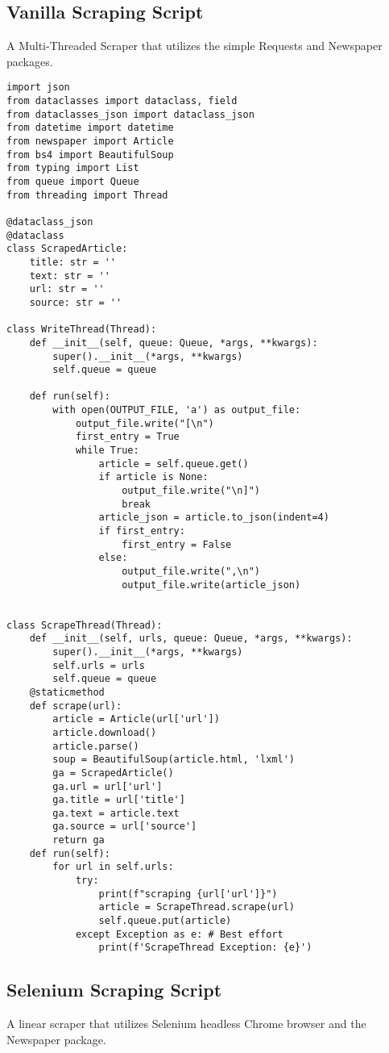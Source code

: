 \subsection{Vanilla Scraping Script}
A Multi-Threaded Scraper that utilizes the simple Requests and Newspaper packages.

\begin{verbatim}
import json
from dataclasses import dataclass, field
from dataclasses_json import dataclass_json
from datetime import datetime
from newspaper import Article
from bs4 import BeautifulSoup
from typing import List
from queue import Queue
from threading import Thread

@dataclass_json
@dataclass
class ScrapedArticle:
    title: str = ''
    text: str = ''
    url: str = ''
    source: str = ''

class WriteThread(Thread):
    def __init__(self, queue: Queue, *args, **kwargs):
        super().__init__(*args, **kwargs)
        self.queue = queue

    def run(self):
        with open(OUTPUT_FILE, 'a') as output_file:
            output_file.write("[\n")
            first_entry = True
            while True:
                article = self.queue.get()
                if article is None:
                    output_file.write("\n]")
                    break
                article_json = article.to_json(indent=4)
                if first_entry:
                    first_entry = False
                else:
                    output_file.write(",\n")
                    output_file.write(article_json)


class ScrapeThread(Thread):
    def __init__(self, urls, queue: Queue, *args, **kwargs):
        super().__init__(*args, **kwargs)
        self.urls = urls
        self.queue = queue
    @staticmethod
    def scrape(url):
        article = Article(url['url'])
        article.download()
        article.parse()
        soup = BeautifulSoup(article.html, 'lxml')
        ga = ScrapedArticle()
        ga.url = url['url']
        ga.title = url['title']
        ga.text = article.text
        ga.source = url['source']
        return ga
    def run(self):
        for url in self.urls: 
            try:
                print(f"scraping {url['url']}")
                article = ScrapeThread.scrape(url)
                self.queue.put(article)
            except Exception as e: # Best effort
                print(f'ScrapeThread Exception: {e}')
\end{verbatim}

\subsection{Selenium Scraping Script}
A linear scraper that utilizes Selenium headless Chrome browser and the Newspaper package.

